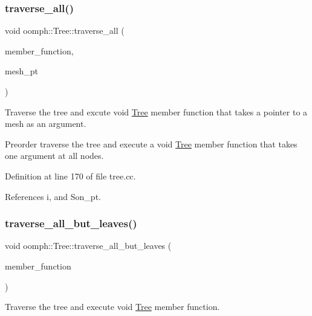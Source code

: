 \subsubsection{\texorpdfstring{traverse\+\_\+all()}{traverse\_all()}\hspace{0.1cm}{\footnotesize\ttfamily [2/2]}}
{\footnotesize\ttfamily void oomph\+::\+Tree\+::traverse\+\_\+all (\begin{DoxyParamCaption}\item[{\hyperlink{classoomph_1_1Tree_a3e690483c4f28d0a34b24b6ef7eba7f0}{Tree\+::\+Void\+Mesh\+Pt\+Argument\+Member\+Fct\+Pt}}]{member\+\_\+function,  }\item[{\hyperlink{classoomph_1_1Mesh}{Mesh} $\ast$\&}]{mesh\+\_\+pt }\end{DoxyParamCaption})}



Traverse the tree and excute void \hyperlink{classoomph_1_1Tree}{Tree} member function that takes a pointer to a mesh as an argument. 

Preorder traverse the tree and execute a void \hyperlink{classoomph_1_1Tree}{Tree} member function that takes one argument at all nodes. 

Definition at line 170 of file tree.\+cc.



References i, and Son\+\_\+pt.

\mbox{\label{classoomph_1_1Tree_aef175445b09edb47624c4b88c6d548bc}} 
\subsubsection{\texorpdfstring{traverse\+\_\+all\+\_\+but\+\_\+leaves()}{traverse\_all\_but\_leaves()}}
{\footnotesize\ttfamily void oomph\+::\+Tree\+::traverse\+\_\+all\+\_\+but\+\_\+leaves (\begin{DoxyParamCaption}\item[{\hyperlink{classoomph_1_1Tree_af04461175b6345658a215ecf039eb69e}{Tree\+::\+Void\+Member\+Fct\+Pt}}]{member\+\_\+function }\end{DoxyParamCaption})}



Traverse the tree and execute void \hyperlink{classoomph_1_1Tree}{Tree} member function. 

